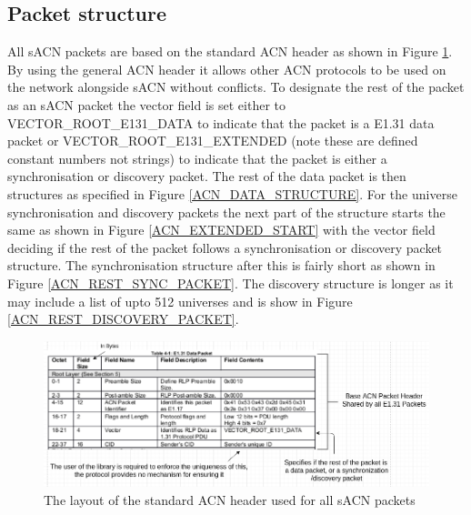 \documentclass[11pt,a4paper]{report}
\begin{document}
\subsection{Packet structure}
All sACN packets are based on the standard ACN header as shown in Figure \ref{ACN_HEADER}. By using the general ACN header it allows other ACN protocols to be used on the network alongside sACN without conflicts. To designate the rest of the packet as an sACN packet the vector field is set either to VECTOR\_ROOT\_E131\_DATA to indicate that the packet is a E1.31 data packet or VECTOR\_ROOT\_E131\_EXTENDED (note these are defined constant numbers not strings) to indicate that the packet is either a synchronisation or discovery packet. The rest of the data packet is then structures as specified in Figure \ref{ACN_DATA_STRUCTURE}. For the universe synchronisation and discovery packets the next part of the structure starts the same as shown in Figure \ref{ACN_EXTENDED_START} with the vector field deciding if the rest of the packet follows a synchronisation or discovery packet structure. The synchronisation structure after this is fairly short as shown in Figure \ref{ACN_REST_SYNC_PACKET}. The discovery structure is longer as it may include a list of upto 512 universes and is show in Figure \ref{ACN_REST_DISCOVERY_PACKET}.

\begin{figure}[H]
\label{ACN_HEADER}
\includegraphics[width=\textwidth]{Acn_header}
\caption{The layout of the standard ACN header used for all sACN packets}
\end{figure}
\end{document}
